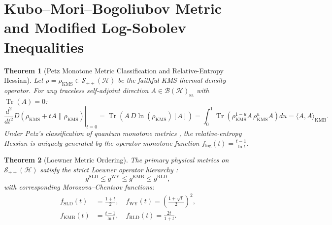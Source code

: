 \documentclass[11pt,a4paper,reqno]{article}
\newtheorem{theorem}{Theorem}[section]
\theoremstyle{definition}
\DeclareMathOperator{\Tr}{Tr}
\newcommand{\KMS}{\mathrm{KMS}}
\numberwithin{equation}{section}
\begin{document}
\section{Kubo--Mori--Bogoliubov Metric and Modified Log-Sobolev Inequalities}

\begin{theorem}[Petz Monotone Metric Classification and Relative-Entropy Hessian]
Let $\rho = \rho_{\KMS} \in \mathcal{S}_{++}(\mathcal{H})$ be the faithful KMS thermal density operator. For any traceless self-adjoint direction $A \in \mathcal{B}(\mathcal{H})_{\mathrm{sa}}$ with $\Tr(A) = 0$:
\begin{equation}
\left. \frac{d^2}{dt^2} D(\rho_{\KMS} + t A \parallel \rho_{\KMS}) \right|_{t=0} = \Tr\left( A \, D\ln(\rho_{\KMS})[A] \right) = \int_0^1 \Tr\left( \rho_{\KMS}^{1-u} A \, \rho_{\KMS}^u A \right) du = \langle A, A \rangle_{\mathrm{KMB}}.
\end{equation}
Under Petz's classification of quantum monotone metrics \cite{Petz1986}, the relative-entropy Hessian is uniquely generated by the operator monotone function $f_{\mathrm{log}}(t) = \frac{t - 1}{\ln t}$.
\end{theorem}

\begin{theorem}[Loewner Metric Ordering]
The primary physical metrics on $\mathcal{S}_{++}(\mathcal{H})$ satisfy the strict Loewner operator hierarchy \cite{Petz1986}:
\begin{equation}
g^{\mathrm{SLD}} \le g^{\mathrm{WY}} \le g^{\mathrm{KMB}} \le g^{\mathrm{RLD}},
\end{equation}
with corresponding Morozova--Chentsov functions:
\begin{align}
f_{\mathrm{SLD}}(t) &= \frac{1 + t}{2}, \quad f_{\mathrm{WY}}(t) = \left( \frac{1 + \sqrt{t}}{2} \right)^2, \\
f_{\mathrm{KMB}}(t) &= \frac{t - 1}{\ln t}, \quad f_{\mathrm{RLD}}(t) = \frac{2t}{1 + t}.
\end{align}
\end{theorem}
\end{document}
